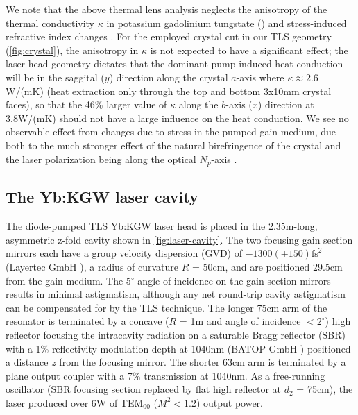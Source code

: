 We note that the above thermal lens analysis neglects the anisotropy of the thermal conductivity $\kappa$ in potassium gadolinium tungstate () \cite{Biswal_thermo_optical_05,mochalov_laser_1997} and stress-induced refractive index changes \cite{Yumashev_laser_2007}.
For the employed crystal cut in our TLS geometry (\ref{fig:crystal}), the anisotropy in $\kappa$ \cite{mochalov_laser_1997,website_EKSPLA} is not expected to have a significant effect; the laser head geometry dictates that the dominant pump-induced heat conduction will be in the saggital ($y$) direction along the crystal $a$-axis where $\kappa \approx 2.6$W/(mK) (heat extraction only through the top and bottom 3x10mm crystal faces), so that the 46\% larger value of $\kappa$ along the $b$-axis ($x$) direction at 3.8W/(mK) should not have a large influence on the heat conduction.
We see no observable effect from changes due to stress in the pumped gain medium, due both to the much stronger effect of the natural birefringence of the crystal and the laser polarization being along the optical $N_p$-axis \cite{Holtom_mode_locked_2006}.

\subsection{The Yb:KGW laser cavity}

The diode-pumped TLS Yb:KGW laser head is placed in the 2.35m-long, asymmetric z-fold cavity shown in \ref{fig:laser-cavity}.
The two focusing gain section mirrors each have a group velocity dispersion (GVD) of $-1300 ( \pm 150 ) \text{fs}^2$ (Layertec GmbH \cite{website_layertec}), a radius of curvature $R$ = 50cm, and are positioned 29.5cm from the gain medium.
The 5$^\circ$ angle of incidence on the gain section mirrors results in minimal astigmatism, although any net round-trip cavity astigmatism can be compensated for by the TLS technique.
The longer 75cm arm of the resonator is terminated by a concave ($R$ = 1m and angle of incidence $< 2^\circ$) high reflector
focusing the intracavity radiation on a saturable Bragg reflector (SBR) with a 1\% reflectivity modulation depth at 1040nm (BATOP GmbH \cite{website_BATOP}) positioned a distance $z$ from the focusing mirror.
The shorter 63cm arm is terminated by a plane output coupler with a 7\% transmission at 1040nm.
As a free-running oscillator (SBR focusing section replaced by flat high reflector at $d_2$ = 75cm), the laser produced over 6W of TEM$_{00}$ ($M^2 < 1.2$) output power.

